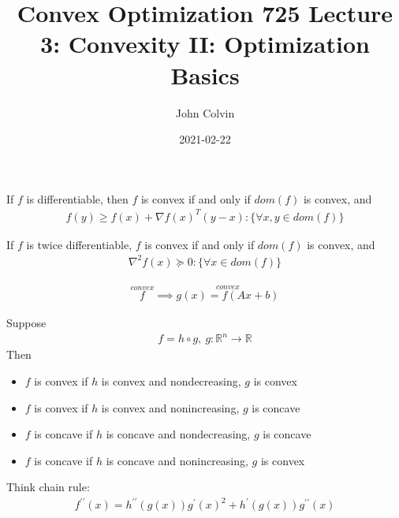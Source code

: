 \documentclass{article}
\title{Convex Optimization 725 Lecture 3: Convexity II: Optimization Basics}
\date{2021-02-22}
\author{John Colvin}
\begin{document}
\maketitle

\begin{theorem}
  If $f$ is differentiable, then $f$ is convex if and only if $dom(f)$ is convex, and
  \begin{align}
    f(y)\geq f(x)+\nabla f(x)^T(y-x):\{\forall x,y\in dom(f)\}
  \end{align}
\end{theorem}
\begin{theorem}
  If $f$ is twice differentiable, $f$ is convex if and only if $dom(f)$ is convex, and
  \begin{align}
    \nabla^2f(x)\succeq 0:\{\forall x\in dom(f)\}
  \end{align}
\end{theorem}
\begin{definition}
  \begin{align}
    \stackrel{convex}{f}\implies \stackrel{convex}{g(x)=f(Ax+b)}
  \end{align}
\end{definition}
\begin{definition}
  Suppose
  \begin{align}
    f=h\circ g,~g:\mathbb{R}^n\rightarrow \mathbb{R}
  \end{align}
  Then\\
  \vpush
  \begin{itemize}
    \item $f$ is convex if $h$ is convex and nondecreasing, $g$ is convex
    \item $f$ is convex if $h$ is convex and nonincreasing, $g$ is concave
    \item $f$ is concave if $h$ is concave and nondecreasing, $g$ is concave
    \item $f$ is concave if $h$ is concave and nonincreasing, $g$ is convex
  \end{itemize}
  Think chain rule:
  \begin{align}
    f^{\prime\prime}(x)=h^{\prime\prime}(g(x))g^\prime(x)^2+h^\prime(g(x))g^{\prime\prime}(x)
  \end{align}
\end{definition}
\end{document}
